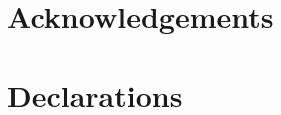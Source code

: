 \ifanonymous\else
\section*{Acknowledgements}

\fi
\section*{Declarations}

\ifdefined\noappendix\else
\appendix

\fi
